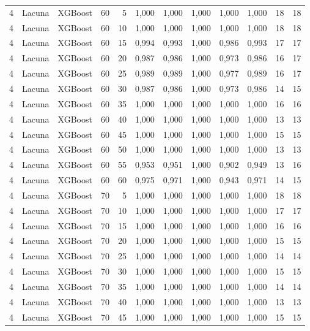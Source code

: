 \begin{longtable}{@{}rllrrrrrrrrr@{}}
4 & Lacuna & XGBoost & 60 & 5 & 1,000 & 1,000 & 1,000 & 1,000 & 1,000 & 18 & 18 \\
4 & Lacuna & XGBoost & 60 & 10 & 1,000 & 1,000 & 1,000 & 1,000 & 1,000 & 18 & 18 \\
4 & Lacuna & XGBoost & 60 & 15 & 0,994 & 0,993 & 1,000 & 0,986 & 0,993 & 17 & 17 \\
4 & Lacuna & XGBoost & 60 & 20 & 0,987 & 0,986 & 1,000 & 0,973 & 0,986 & 16 & 17 \\
4 & Lacuna & XGBoost & 60 & 25 & 0,989 & 0,989 & 1,000 & 0,977 & 0,989 & 16 & 17 \\
4 & Lacuna & XGBoost & 60 & 30 & 0,987 & 0,986 & 1,000 & 0,973 & 0,986 & 14 & 15 \\
4 & Lacuna & XGBoost & 60 & 35 & 1,000 & 1,000 & 1,000 & 1,000 & 1,000 & 16 & 16 \\
4 & Lacuna & XGBoost & 60 & 40 & 1,000 & 1,000 & 1,000 & 1,000 & 1,000 & 13 & 13 \\
4 & Lacuna & XGBoost & 60 & 45 & 1,000 & 1,000 & 1,000 & 1,000 & 1,000 & 15 & 15 \\
4 & Lacuna & XGBoost & 60 & 50 & 1,000 & 1,000 & 1,000 & 1,000 & 1,000 & 13 & 13 \\
4 & Lacuna & XGBoost & 60 & 55 & 0,953 & 0,951 & 1,000 & 0,902 & 0,949 & 13 & 16 \\
4 & Lacuna & XGBoost & 60 & 60 & 0,975 & 0,971 & 1,000 & 0,943 & 0,971 & 14 & 15 \\
4 & Lacuna & XGBoost & 70 & 5 & 1,000 & 1,000 & 1,000 & 1,000 & 1,000 & 18 & 18 \\
4 & Lacuna & XGBoost & 70 & 10 & 1,000 & 1,000 & 1,000 & 1,000 & 1,000 & 17 & 17 \\
4 & Lacuna & XGBoost & 70 & 15 & 1,000 & 1,000 & 1,000 & 1,000 & 1,000 & 16 & 16 \\
4 & Lacuna & XGBoost & 70 & 20 & 1,000 & 1,000 & 1,000 & 1,000 & 1,000 & 15 & 15 \\
4 & Lacuna & XGBoost & 70 & 25 & 1,000 & 1,000 & 1,000 & 1,000 & 1,000 & 14 & 14 \\
4 & Lacuna & XGBoost & 70 & 30 & 1,000 & 1,000 & 1,000 & 1,000 & 1,000 & 15 & 15 \\
4 & Lacuna & XGBoost & 70 & 35 & 1,000 & 1,000 & 1,000 & 1,000 & 1,000 & 14 & 14 \\
4 & Lacuna & XGBoost & 70 & 40 & 1,000 & 1,000 & 1,000 & 1,000 & 1,000 & 13 & 13 \\
4 & Lacuna & XGBoost & 70 & 45 & 1,000 & 1,000 & 1,000 & 1,000 & 1,000 & 15 & 15 \\

\end{longtable}
